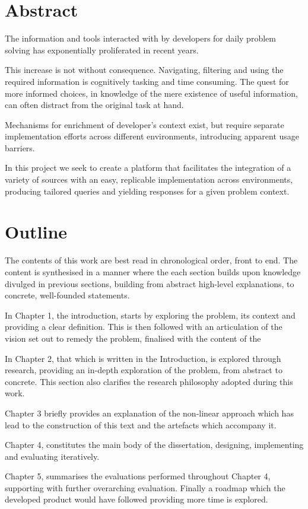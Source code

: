 \chapter*{Abstract}

The information and tools interacted with by developers for daily problem solving has exponentially proliferated in recent years. 

This increase is not without consequence. Navigating, filtering and using the required information is cognitively tasking and time consuming. The quest for more informed choices, in knowledge of the mere existence of useful information, can often distract from the original task at hand. 

Mechanisms for enrichment of developer's context exist, but require separate implementation efforts across different environments, introducing apparent usage barriers.

In this project we seek to create a platform that facilitates the integration of a variety of sources with an easy, replicable implementation across environments, producing tailored queries and yielding responses for a given problem context.  



\chapter*{Outline}

The contents of this work are best read in chronological order, front to end. The content is synthesised in a manner where the each section builds upon knowledge divulged in previous sections, building from abstract high-level explanations, to concrete, well-founded statements.

In Chapter 1, the introduction, starts by exploring the problem, its context and providing a clear definition. This is then followed with an articulation of the vision set out to remedy the problem, finalised with the content of the 

In Chapter 2, that which is written in the Introduction, is explored through research, providing an in-depth exploration of the problem, from abstract to concrete. This section also clarifies the research philosophy adopted during this work.

Chapter 3 briefly provides an explanation of the non-linear approach which has lead to the construction of this text and the artefacts which accompany it.

Chapter 4, constitutes the main body of the dissertation, designing, implementing and evaluating iteratively.

Chapter 5, summarises the evaluations performed throughout Chapter 4, supporting with further overarching evaluation. Finally a roadmap which the developed product would have followed providing more time is explored.